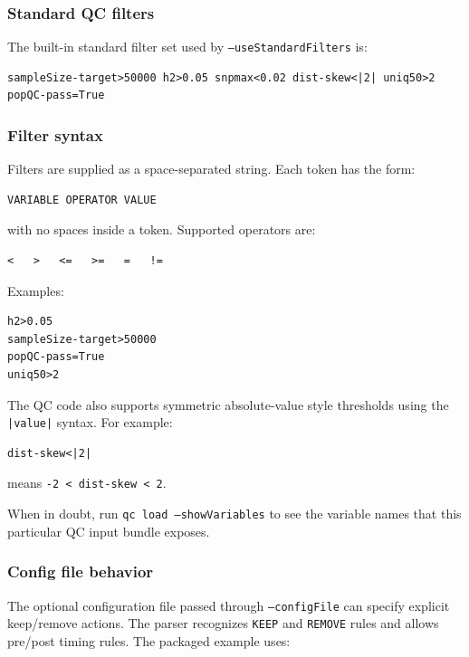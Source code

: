 \documentclass[11pt]{article}
\begin{document}
\subsubsection*{Standard QC filters}

The built-in standard filter set used by \texttt{--useStandardFilters} is:

\begin{verbatim}
sampleSize-target>50000 h2>0.05 snpmax<0.02 dist-skew<|2| uniq50>2 popQC-pass=True
\end{verbatim}

\subsubsection*{Filter syntax}

Filters are supplied as a space-separated string. Each token has the form:

\begin{verbatim}
VARIABLE OPERATOR VALUE
\end{verbatim}

with no spaces inside a token. Supported operators are:

\begin{verbatim}
<   >   <=   >=   =   !=
\end{verbatim}

Examples:

\begin{verbatim}
h2>0.05
sampleSize-target>50000
popQC-pass=True
uniq50>2
\end{verbatim}

The QC code also supports symmetric absolute-value style thresholds using the \texttt{|value|} syntax. For example:

\begin{verbatim}
dist-skew<|2|
\end{verbatim}

means \texttt{-2 < dist-skew < 2}.

When in doubt, run \texttt{qc load --showVariables} to see the variable names that this particular QC input bundle exposes.

\subsubsection*{Config file behavior}

The optional configuration file passed through \texttt{--configFile} can specify explicit keep/remove actions. The parser recognizes \texttt{KEEP} and \texttt{REMOVE} rules and allows pre/post timing rules. The packaged example uses:
\end{document}
